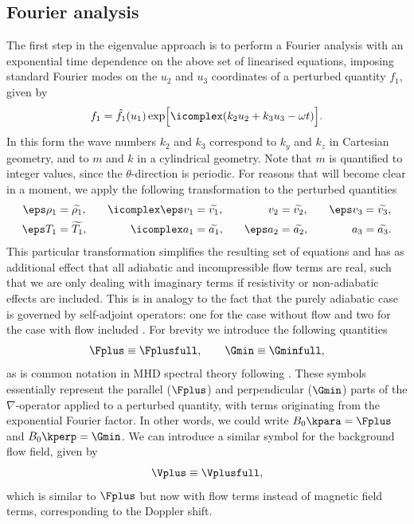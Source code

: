 \subsection{Fourier analysis} \label{ss: fourier}
The first step in the eigenvalue approach is to perform a Fourier analysis with an exponential time dependence on the above set of linearised equations, imposing standard Fourier modes on the $u_2$ and $u_3$ coordinates of a perturbed quantity $f_1$, given by
\begin{equation} \label{eq: fourier_analysis}
  f_1 = \hat{f_1}(u_1)\exp\Bigl[\icomplex(k_2 u_2 + k_3 u_3 - \omega t)\Bigr].
\end{equation}
In this form the wave numbers $k_2$ and $k_3$ correspond to $k_y$ and $k_z$ in Cartesian geometry, and to $m$ and $k$ in a cylindrical geometry. Note that $m$ is quantified to integer values, since the $\theta$-direction is periodic. For reasons that will become clear in a moment, we apply the following transformation to the perturbed quantities
\begin{equation}
  \begin{alignedat}{4} \label{eq: transformation}
    \eps \rho_1 &= \widetilde{\rho_1},
    \qquad&
    \icomplex \eps v_1 &= \widetilde{v_1},
    \qquad&
    v_2 &= \widetilde{v_2},
    \qquad&
    \eps v_3 &= \widetilde{v_3}, \\
    \eps T_1 &= \widetilde{T_1},
    &
    \icomplex a_1 &= \widetilde{a_1},
    &
    \eps a_2 &= \widetilde{a_2},
    &
    a_3 &= \widetilde{a_3}. \\
  \end{alignedat}
\end{equation}
This particular transformation simplifies the resulting set of equations and has as additional effect that all adiabatic and incompressible flow terms are real, such that we are only dealing with imaginary terms if resistivity or non-adiabatic effects are included. This is in analogy to the fact that the purely adiabatic case is governed by self-adjoint operators: one for the case without flow and two for the case with flow included \citep{goedbloed2018_web1,goedbloed2018_web2}. For brevity we introduce the following quantities
\begin{equation} \label{eq: F_G_operators}
  \Fplus \equiv \Fplusfull,
  \qquad
  \Gmin \equiv \Gminfull,
\end{equation}
as is common notation in MHD spectral theory following \citet{book_MHD}. These symbols essentially represent the parallel ($\Fplus$) and perpendicular ($\Gmin$) parts of the $\nabla$-operator applied to a perturbed quantity, with terms originating from the exponential Fourier factor. In other words, we could write $B_0 \kpara = \Fplus$
and $B_0 \kperp = \Gmin$. We can introduce a similar symbol for the background flow field, given by
\begin{equation} \label{eq: V_operator}
  \Vplus \equiv \Vplusfull,
\end{equation}
which is similar to $\Fplus$ but now with flow terms instead of magnetic field terms, corresponding to the Doppler shift.

